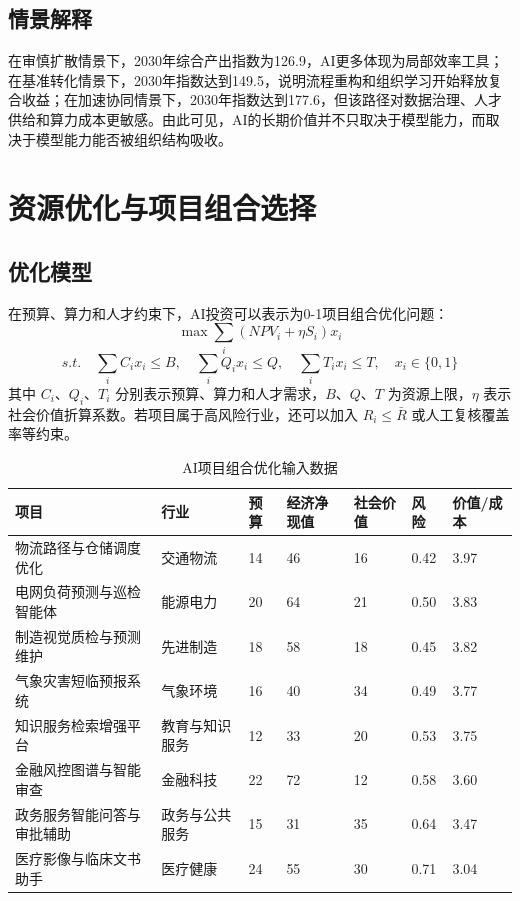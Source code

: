 \documentclass[UTF8,a4paper,12pt]{ctexart}
\begin{document}
\subsection{情景解释}
在审慎扩散情景下，2030年综合产出指数为126.9，AI更多体现为局部效率工具；在基准转化情景下，2030年指数达到149.5，说明流程重构和组织学习开始释放复合收益；在加速协同情景下，2030年指数达到177.6，但该路径对数据治理、人才供给和算力成本更敏感。由此可见，AI的长期价值并不只取决于模型能力，而取决于模型能力能否被组织结构吸收。

\section{资源优化与项目组合选择}
\subsection{优化模型}
在预算、算力和人才约束下，AI投资可以表示为0-1项目组合优化问题：
\[
\max \sum_i (NPV_i+\eta S_i)x_i
\]
\[
s.t.\quad \sum_i C_i x_i \le B,\quad \sum_i Q_i x_i \le Q,\quad \sum_i T_i x_i \le T,\quad x_i\in\{0,1\}
\]
其中 $C_i$、$Q_i$、$T_i$ 分别表示预算、算力和人才需求，$B$、$Q$、$T$ 为资源上限，$\eta$ 表示社会价值折算系数。若项目属于高风险行业，还可以加入 $R_i \le \bar R$ 或人工复核覆盖率等约束。

\begin{table}[H]
\centering
\small
\renewcommand{\arraystretch}{1.18}
\begin{tabular}{p{} p{} p{} p{} p{} p{} p{}}
\toprule
项目 & 行业 & 预算 & 经济净现值 & 社会价值 & 风险 & 价值/成本 \\
\midrule
物流路径与仓储调度优化 & 交通物流 & 14 & 46 & 16 & 0.42 & 3.97 \\
电网负荷预测与巡检智能体 & 能源电力 & 20 & 64 & 21 & 0.50 & 3.83 \\
制造视觉质检与预测维护 & 先进制造 & 18 & 58 & 18 & 0.45 & 3.82 \\
气象灾害短临预报系统 & 气象环境 & 16 & 40 & 34 & 0.49 & 3.77 \\
知识服务检索增强平台 & 教育与知识服务 & 12 & 33 & 20 & 0.53 & 3.75 \\
金融风控图谱与智能审查 & 金融科技 & 22 & 72 & 12 & 0.58 & 3.60 \\
政务服务智能问答与审批辅助 & 政务与公共服务 & 15 & 31 & 35 & 0.64 & 3.47 \\
医疗影像与临床文书助手 & 医疗健康 & 24 & 55 & 30 & 0.71 & 3.04 \\
\bottomrule
\end{tabular}
\caption{AI项目组合优化输入数据}
\label{tab:portfolio}
\end{table}
\end{document}
